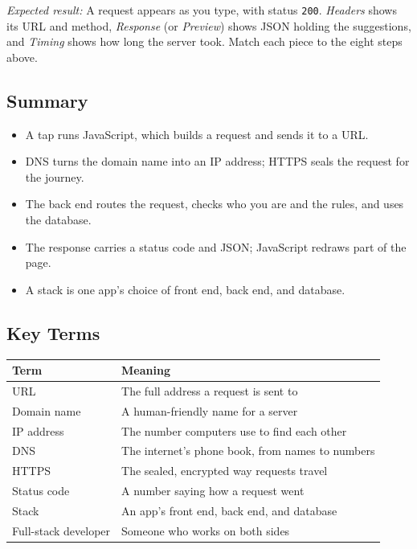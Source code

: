 \noindent{}\emph{Expected result:} A request appears as you type, with status \texttt{200}. \emph{Headers} shows its URL and method, \emph{Response} (or \emph{Preview}) shows JSON holding the suggestions, and \emph{Timing} shows how long the server took. Match each piece to the eight steps above.

\label{webapp-04:summary-key-terms-and-review-questions}

\subsection*{Summary}\label{webapp-04:summary}

\begin{itemize}
\tightlist
\item
  A tap runs JavaScript, which builds a request and sends it to a URL.
\item
  DNS turns the domain name into an IP address; HTTPS seals the request for the journey.
\item
  The back end routes the request, checks who you are and the rules, and uses the database.
\item
  The response carries a status code and JSON; JavaScript redraws part of the page.
\item
  A stack is one app's choice of front end, back end, and database.
\end{itemize}


\subsection*{Key Terms}\label{webapp-04:key-terms}

{\def\LTcaptype{none} %
\begin{longtable}[]{@{}ll@{}}
\toprule\noalign{}
Term & Meaning \\
\midrule\noalign{}
\endhead
\bottomrule\noalign{}
\endlastfoot
URL & The full address a request is sent to \\
Domain name & A human-friendly name for a server \\
IP address & The number computers use to find each other \\
DNS & The internet's phone book, from names to numbers \\
HTTPS & The sealed, encrypted way requests travel \\
Status code & A number saying how a request went \\
Stack & An app's front end, back end, and database \\
Full-stack developer & Someone who works on both sides \\
\end{longtable}
}

